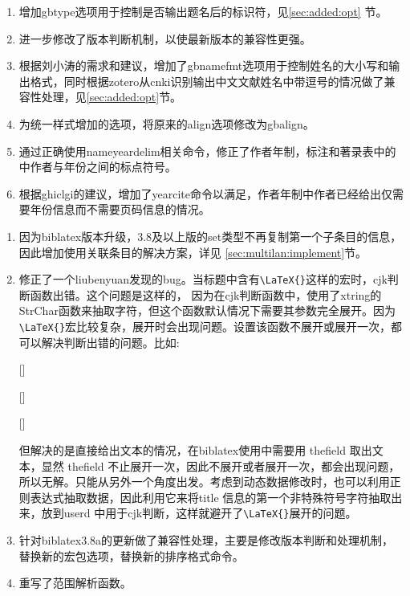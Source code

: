 \label{up:180120}
\begin{enumerate}
\item 增加gbtype选项用于控制是否输出题名后的标识符，见\ref{sec:added:opt} 节。
\item 进一步修改了版本判断机制，以使最新版本的兼容性更强。
\item 根据刘小涛的需求和建议，增加了gbnamefmt选项用于控制姓名的大小写和输出格式，同时根据zotero从cnki识别输出中文文献姓名中带逗号的情况做了兼容性处理，见\ref{sec:added:opt}节。
\item 为统一样式增加的选项，将原来的align选项修改为gbalign。
\item 通过正确使用nameyeardelim相关命令，修正了作者年制，标注和著录表中的中作者与年份之间的标点符号。
\item 根据ghiclgi的建议，增加了yearcite命令以满足，作者年制中作者已经给出仅需要年份信息而不需要页码信息的情况。
\end{enumerate}

\label{up:171121}
\begin{enumerate}
\item 因为biblatex版本升级，3.8及以上版的set类型不再复制第一个子条目的信息，因此增加使用关联条目的解决方案，详见
\ref{sec:multilan:implement}节。

\item 修正了一个liubenyuan发现的bug。当标题中含有\verb|\LaTeX{}|这样的宏时，cjk判断函数出错。这个问题是这样的，
    因为在cjk判断函数中，使用了xtring的StrChar函数来抽取字符，但这个函数默认情况下需要其参数完全展开。因为\verb|\LaTeX{}|宏比较复杂，展开时会出现问题。设置该函数不展开或展开一次，都可以解决判断出错的问题。比如:
    \begin{texlist}
    \expandarg
    [\tempa]%
    \tempa

    [\tempa]%
    \tempa

    [\tempa]%
    \tempa
    \end{texlist}
    但解决的是直接给出文本的情况，在biblatex使用中需要用 thefield 取出文本，显然 thefield 不止展开一次，因此不展开或者展开一次，都会出现问题，所以无解。只能从另外一个角度出发。考虑到动态数据修改时，也可以利用正则表达式抽取数据，因此利用它来将title 信息的第一个非特殊符号字符抽取出来，放到userd 中用于cjk判断，这样就避开了\verb|\LaTeX{}|展开的问题。

\item 针对biblatex3.8a的更新做了兼容性处理，主要是修改版本判断和处理机制，替换新的宏包选项，替换新的排序格式命令。

\item 重写了范围解析函数。

\end{enumerate}

